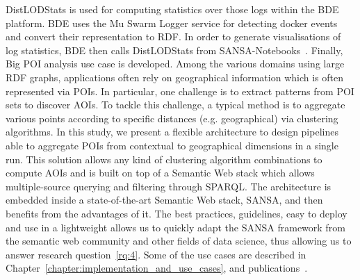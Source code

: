\begin{enumerate}
    DistLODStats is used for computing statistics over those logs within the BDE platform. 
    BDE uses the Mu Swarm Logger service for detecting docker events and convert their representation to \gls{RDF}. 
    In order to generate visualisations of log statistics, BDE then calls DistLODStats from SANSA-Notebooks~\cite{iermilov-2017-sansa-iswc-demo}.
    Finally, Big \gls{POI} analysis use case is developed.
    Among the various domains using large \gls{RDF} graphs, applications often rely on geographical information which is often represented via \gls{POI}s.
    In particular, one challenge is to extract patterns from \gls{POI} sets to discover \gls{AOI}s.
    To tackle this challenge, a typical method is to aggregate various points according to specific distances (e.g. geographical) via clustering algorithms. 
    In this study, we present a flexible architecture to design pipelines able to aggregate \gls{POI}s from contextual to geographical dimensions in a single run. 
    This solution allows any kind of clustering algorithm combinations to compute \gls{AOI}s and is built on top of a Semantic Web stack which allows multiple-source querying and filtering through \gls{SPARQL}.
    The architecture is embedded inside a state-of-the-art Semantic Web stack, SANSA, and then benefits from the advantages of it.
    The best practices, guidelines, easy to deploy and use in a lightweight allows us to quickly adapt the SANSA framework from the semantic web community and other fields of data science, thus allowing us to answer research question~\ref{rq:4}.
    Some of the use cases are described in Chapter~\ref{chapter:implementation_and_use_cases}, and publications~\cite{lehmann-2017-sansa-iswc, iermilov-2017-sansa-iswc-demo, sansa-hubs-and-authorities-transaction-semantics19-poster, piping-clustering-eswc19-poster, graux-2018-sansa-ethereum-semantics-poster, Auer+ICWE-2017}.

\end{enumerate}


